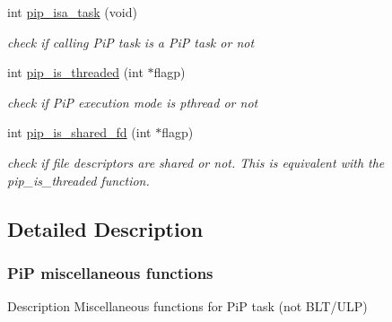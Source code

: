 \documentclass[twoside]{book}
\begin{document}
\begin{DoxyCompactItemize}
int \hyperlink{group__pip-5-misc_gaf0283e47ad2d415206d6a3fa61e8a0a9}{pip\-\_\-isa\-\_\-task} (void)
\begin{DoxyCompactList}\small\item\em check if calling Pi\-P task is a Pi\-P task or not \end{DoxyCompactList}\item 
int \hyperlink{group__pip-5-misc_ga0455093d5040ae45585cc88a5f3f002b}{pip\-\_\-is\-\_\-threaded} (int $\ast$flagp)
\begin{DoxyCompactList}\small\item\em check if Pi\-P execution mode is pthread or not \end{DoxyCompactList}\item 
int \hyperlink{group__pip-5-misc_ga180ece8f3f537d84db8e70921f3ae099}{pip\-\_\-is\-\_\-shared\-\_\-fd} (int $\ast$flagp)
\begin{DoxyCompactList}\small\item\em check if file descriptors are shared or not. This is equivalent with the {\ttfamily pip\-\_\-is\-\_\-threaded} function. \end{DoxyCompactList}\end{DoxyCompactItemize}


\subsection{Detailed Description}
\hypertarget{pip-misc}{}\subsubsection{Pi\-P miscellaneous functions}\label{pip-misc}
\begin{DoxyParagraph}{Description}
Miscellaneous functions for Pi\-P task (not B\-L\-T/\-U\-L\-P) 
\end{DoxyParagraph}
\end{document}

